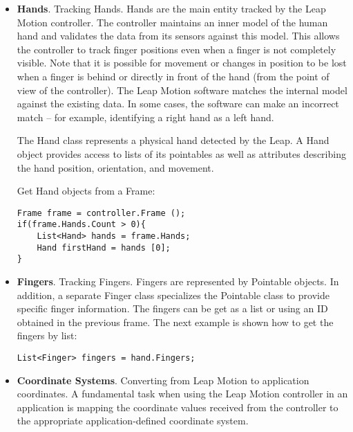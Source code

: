 {\begin{itemize}
Then getting data from a frame as the basic objects tracked by the Leap Motion system is shown in \autoref{data}:

\begin{lstlisting}[caption={Getting data from a frame},label={data}]

Frame frame = controller.Frame ();
List<Hand> hands = frame.Hands;
\end{lstlisting}


The returned object by the Frame object are all read-only. They can be stored and used later in the future.

\item \textbf{Hands}. Tracking Hands.
Hands are the main entity tracked by the Leap Motion controller. The controller maintains an inner model of the human hand and validates the data from its sensors against this model. This allows the controller to track finger positions even when a finger is not completely visible. Note that it is possible for movement or changes in position to be lost when a finger is behind or directly in front of the hand (from the point of view of the controller). The Leap Motion software matches the internal model against the existing data. In some cases, the software can make an incorrect match – for example, identifying a right hand as a left hand.

The Hand class represents a physical hand detected by the Leap. A Hand object provides access to lists of its pointables as well as attributes describing the hand position, orientation, and movement.

Get Hand objects from a Frame:
\begin{lstlisting}[caption={Getting Hand from a Frame},label={hand}]
Frame frame = controller.Frame (); 
if(frame.Hands.Count > 0){
    List<Hand> hands = frame.Hands;
    Hand firstHand = hands [0];
}
\end{lstlisting}


\item \textbf{Fingers}. Tracking Fingers.
Fingers are represented by Pointable objects. In addition, a separate Finger class specializes the Pointable class to provide specific finger information.
The fingers can be get as a list or using an ID obtained in the previous frame. The next example is shown how to get the fingers by list:
\begin{lstlisting}[caption={Getting fingers from a Hand by list},label={fingers}]
List<Finger> fingers = hand.Fingers;
\end{lstlisting}
\item \textbf{Coordinate Systems}. Converting from Leap Motion to application coordinates.
A fundamental task when using the Leap Motion controller in an application is mapping the coordinate values received from the controller to the appropriate application-defined coordinate system.


\end{itemize}}
